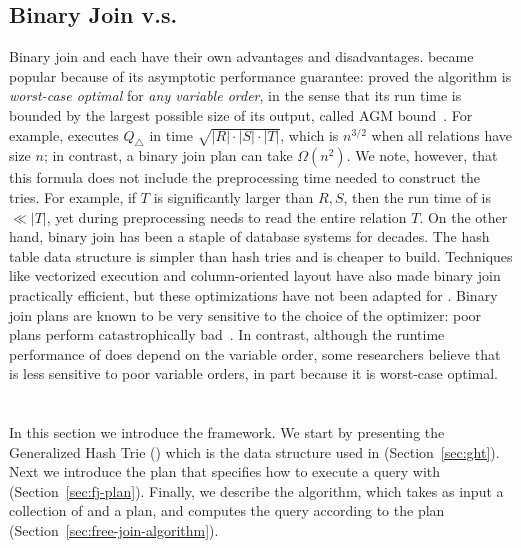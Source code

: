 
\subsection{Binary Join v.s. \GJ}
Binary join and \GJ each have their own advantages and disadvantages.
\GJ became popular because of its asymptotic performance guarantee:
\cite{DBLP:journals/sigmod/NgoRR13} proved the algorithm is
\emph{worst-case optimal} for \emph{any variable order}, in the sense
that its run time is bounded by the largest possible size of its
output, called AGM bound~\cite{DBLP:journals/siamcomp/AtseriasGM13}.
For example, \GJ executes $Q_\triangle$ in time
$\sqrt{|R|\cdot |S| \cdot |T|}$, which is $n^{3/2}$ when all relations
have size $n$; in contrast, a binary join plan can take $\Omega(n^2)$.
We note, however, that this formula does not include the preprocessing
time needed to construct the tries.  For example, if $T$ is
significantly larger than $R, S$, then the run time of \GJ is
$\ll |T|$, yet during preprocessing \GJ needs to read the entire
relation $T$.  On the other hand, binary join has been a staple of
database systems for decades.  The hash table data structure is
simpler than hash tries and is cheaper to build.  Techniques like
vectorized execution and column-oriented layout have also made binary
join practically efficient, but these optimizations have not been
adapted for \GJ.  Binary join plans are known to be very sensitive to
the choice of the optimizer: poor plans perform catastrophically
bad~\cite{DBLP:journals/pvldb/LeisGMBK015}.  In contrast, although the
runtime performance of \GJ does depend on the variable order, some
researchers believe that \GJ is less sensitive to poor variable
orders, in part because it is worst-case optimal.

\section{\FJ}\label{sec:free-join}

In this section we introduce the \FJ framework.
We start by presenting the Generalized Hash Trie (\GHT) which
 is the data structure used in \FJ (Section~\ref{sec:ght}).
Next we introduce the \FJ plan that specifies 
  how to execute a query with \FJ (Section~\ref{sec:fj-plan}).
Finally, we describe the \FJ algorithm, 
  which takes as input a collection of \GHTs 
  and a \FJ plan,
  and computes the query according to the plan (Section~\ref{sec:free-join-algorithm}).
  
